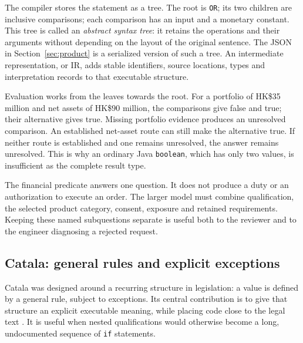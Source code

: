 The compiler stores the statement as a tree. The root is \texttt{OR}; its two
children are inclusive comparisons; each comparison has an input and a monetary
constant. This tree is called an \emph{abstract syntax tree}: it retains the
operations and their arguments without depending on the layout of the original
sentence. The JSON in Section~\ref{sec:product} is a serialized version of such
a tree. An intermediate representation, or IR, adds stable identifiers, source
locations, types and interpretation records to that executable structure.

Evaluation works from the leaves towards the root. For a portfolio of HK\$35
million and net assets of HK\$90 million, the comparisons give false and true;
their alternative gives true. Missing portfolio evidence produces an unresolved
comparison. An established net-asset route can still make the alternative true.
If neither route is established and one remains unresolved, the answer remains
unresolved. This is why an ordinary Java \texttt{boolean}, which has only two
values, is insufficient as the complete result type.

The financial predicate answers one question. It does not produce a duty or an
authorization to execute an order. The larger model must combine qualification,
the selected product category, consent, exposure and retained requirements.
Keeping these named subquestions separate is useful both to the reviewer and
to the engineer diagnosing a rejected request.

\subsection{Catala: general rules and explicit exceptions}

Catala was designed around a recurring structure in legislation: a value is
defined by a general rule, subject to exceptions. Its central contribution is
to give that structure an explicit executable meaning, while placing code close
to the legal text \citep[secs.~2--4]{catala2021}. It is useful when nested
qualifications would otherwise become a long, undocumented sequence of
\texttt{if} statements.

